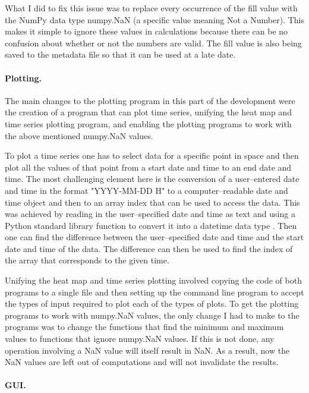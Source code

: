 \documentclass[../00_main.tex]{subfiles}
\begin{document}
What I did to fix this issue was to replace every occurrence of the fill value 
with the NumPy data type numpy.NaN (a specific value meaning Not a Number). 
This makes it simple to ignore these values in calculations because there can 
be no confusion about whether or not the numbers are valid. The fill value is 
also being saved to the metadata file so that it can be used at a late date.

\paragraph{Plotting.}

The main changes to the plotting program in this part of the development were
the creation of a program that can plot time series, unifying the heat map and
time series plotting program, and enabling the plotting programs to work with
the above mentioned numpy.NaN values.\newline

To plot a time series one has to select data for a specific point in space and
then plot all the values of that point from a start date and time to an end
date and time. The most challenging element here is the conversion of
a user--entered date and time in the format "YYYY-MM-DD H" to a 
computer--readable date and time object and then to an array index that can be
used to access the data. This was achieved by reading in the user--specified
date and time as text and using a Python standard library function to convert it
into a datetime data type \cite{py-datetime}. Then one can find the difference 
between the user--specified date and time and the start date and time of the 
data. The difference can then be used to find the index of the array that 
corresponds to the given time.\newline

Unifying the heat map and time series plotting involved copying the code of
both programs to a single file and then setting up the command line program to
accept the types of input required to plot each of the types of plots. To get 
the plotting programs to work with numpy.NaN values, the only change I had to 
make to the programs was to change the functions that find the minimum and 
maximum values to functions that ignore numpy.NaN values. If this is not done, 
any operation involving a NaN value will itself result in NaN. As a result, now 
the NaN values are left out of computations and will not invalidate the 
results.

\paragraph{GUI.}
\end{document}

